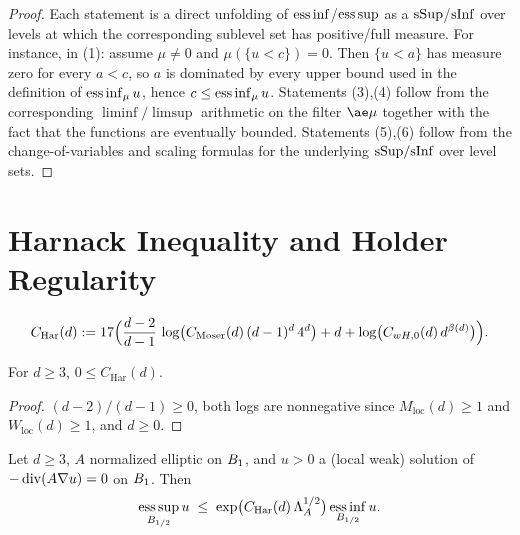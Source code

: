 \begin{proof}
\leanok

Each statement is a direct unfolding of $\operatorname*{ess\,inf}$/$\operatorname*{ess\,sup}$ as a $\mathrm{sSup}$/$\mathrm{sInf}$
over levels at which the corresponding sublevel set has positive/full measure.
For instance, in (1): assume $\mu \neq 0$ and $\mu(\{u < c\}) = 0$. Then
$\{u < a\}$ has measure zero for every $a < c$, so $a$ is dominated by every
upper bound used in the definition of $\operatorname*{ess\,inf}_\mu u$, hence $c \leq
\operatorname*{ess\,inf}_\mu u$. Statements (3),(4) follow from the corresponding
$\liminf/\limsup$ arithmetic on the filter $\ae \mu$ together with the fact
that the functions are eventually bounded. Statements (5),(6) follow from
the change-of-variables and scaling formulas for the underlying
$\mathrm{sSup}/\mathrm{sInf}$ over level sets.
\end{proof}

\section{Harnack Inequality and Holder Regularity}

\begin{definition}
\label{def:Charnack}
\leanok
{}
\begin{equation*}
  C_{\mathrm{Har}}(d) := 17\Bigl(\frac{d-2}{d-1}\,\log\bigl(C_{\mathrm{Moser}}(d)\,(d-1)^d\,4^d\bigr)
        + d + \log\bigl(C_{wH,0}(d)\,d^{\beta(d)}\bigr)\Bigr).
\end{equation*}
\end{definition}

\begin{lemma}
\label{lem:C_harnack_nonneg}
\leanok
{}
For $d \geq 3$, $0 \leq C_{\mathrm{Har}}(d)$.
\end{lemma}

\begin{proof}
\leanok
{}

$(d-2)/(d-1) \geq 0$, both logs are nonnegative since
$M_{\mathrm{loc}}(d) \geq 1$ and $W_{\mathrm{loc}}(d) \geq 1$, and $d \geq 0$.
\end{proof}

\begin{theorem}
\label{thm:harnack}
\leanok
{}
Let $d \geq 3$, $A$ normalized elliptic on $B_{1}$, and $u > 0$ a (local
weak) solution of $-\operatorname{div}(A\nabla u) = 0$ on $B_{1}$. Then
\begin{equation*}
  \operatorname*{ess\,sup}_{B_{1/2}} u \;\leq\; \exp\bigl(C_{\mathrm{Har}}(d)\,\Lambda_A^{1/2}\bigr)
        \operatorname*{ess\,inf}_{B_{1/2}} u.
\end{equation*}
\end{theorem}

